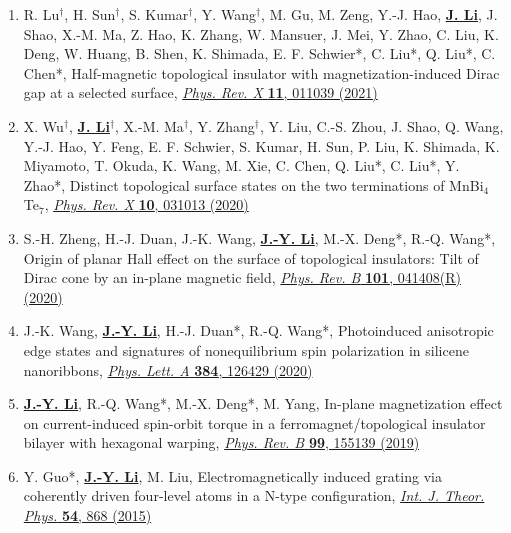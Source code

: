 \documentclass[a4paper,11pt]{article}
\begin{document}
\begin{enumerate}[leftmargin=*]
    \item R. Lu$^{\dagger}$, H. Sun$^{\dagger}$, S. Kumar$^{\dagger}$, Y. Wang$^{\dagger}$, M. Gu, M. Zeng, Y.-J. Hao, \underline{\textbf{J. Li}}, J. Shao, X.-M. Ma, Z. Hao, K. Zhang, W. Mansuer, J. Mei, Y. Zhao, C. Liu, K. Deng, W. Huang, B. Shen, K. Shimada, E. F. Schwier*, C. Liu*, Q. Liu*, C. Chen*, Half-magnetic topological insulator with magnetization-induced Dirac gap at a selected surface, \href{https://doi.org/10.1103/PhysRevX.11.011039}{\textit{Phys. Rev. X} \textbf{11}, 011039 (2021)}

    \item X. Wu$^{\dagger}$, \underline{\textbf{J. Li}}$^{\dagger}$, X.-M. Ma$^{\dagger}$, Y. Zhang$^{\dagger}$, Y. Liu, C.-S. Zhou, J. Shao, Q. Wang, Y.-J. Hao, Y. Feng, E. F. Schwier, S. Kumar, H. Sun, P. Liu, K. Shimada, K. Miyamoto, T. Okuda, K. Wang, M. Xie, C. Chen, Q. Liu*, C. Liu*, Y. Zhao*, Distinct topological surface states on the two terminations of MnBi$_4$Te$_7$, \href{https://doi.org/10.1103/PhysRevX.10.031013}{\textit{Phys. Rev. X} \textbf{10}, 031013 (2020)}

    \item S.-H. Zheng, H.-J. Duan, J.-K. Wang, \underline{\textbf{J.-Y. Li}}, M.-X. Deng*, R.-Q. Wang*, Origin of planar Hall effect on the surface of topological insulators: Tilt of Dirac cone by an in-plane magnetic field, \href{https://doi.org/10.1103/PhysRevB.101.041408}{\textit{Phys. Rev. B} \textbf{101}, 041408(R) (2020)}

    \item J.-K. Wang, \underline{\textbf{J.-Y. Li}}, H.-J. Duan*, R.-Q. Wang*, Photoinduced anisotropic edge states and signatures of nonequilibrium spin polarization in silicene nanoribbons, \href{https://doi.org/10.1016/j.physleta.2020.126429}{\textit{Phys. Lett. A} \textbf{384}, 126429 (2020)}

    \item \underline{\textbf{J.-Y. Li}}, R.-Q. Wang*, M.-X. Deng*, M. Yang, In-plane magnetization effect on current-induced spin-orbit torque in a ferromagnet/topological insulator bilayer with hexagonal warping, \href{https://doi.org/10.1103/PhysRevB.99.155139}{\textit{Phys. Rev. B} \textbf{99}, 155139 (2019)}

    \item Y. Guo*, \underline{\textbf{J.-Y. Li}}, M. Liu, Electromagnetically induced grating via coherently driven four-level atoms in a N-type configuration, \href{https://doi.org/10.1007/s10773-014-2282-7}{\textit{Int. J. Theor. Phys.} \textbf{54}, 868 (2015)}

\end{enumerate}
\end{document}
